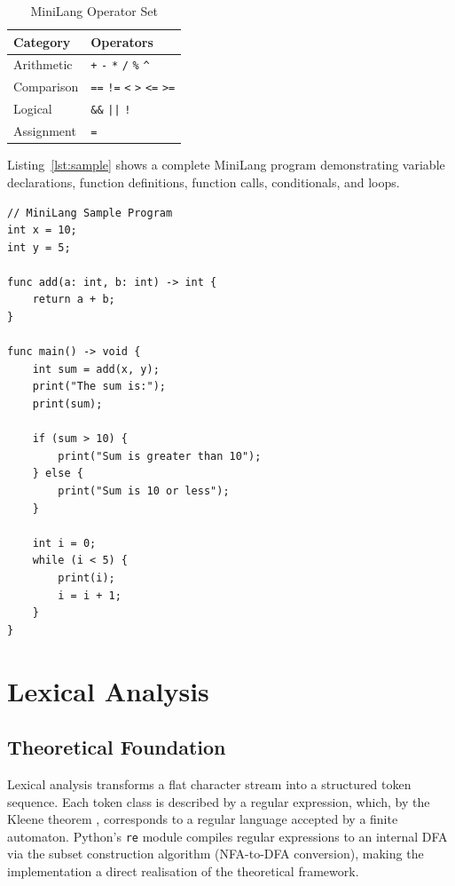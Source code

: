 \documentclass[conference]{IEEEtran}
\begin{document}
\begin{table}[htbp]
\caption{MiniLang Operator Set}
\label{tab:operators}
\centering
\renewcommand{\arraystretch}{1.2}
\begin{tabular}{@{}ll@{}}
\toprule
\textbf{Category} & \textbf{Operators} \\
\midrule
Arithmetic     & \texttt{+} \texttt{-} \texttt{*} \texttt{/} \texttt{\%} \texttt{\^{}} \\
Comparison     & \texttt{==} \texttt{!=} \texttt{<} \texttt{>} \texttt{<=} \texttt{>=} \\
Logical        & \texttt{\&\&} \texttt{||} \texttt{!} \\
Assignment     & \texttt{=} \\
\bottomrule
\end{tabular}
\end{table}

Listing~\ref{lst:sample} shows a complete MiniLang program
demonstrating variable declarations, function definitions, function
calls, conditionals, and loops.

\begin{lstlisting}[language=MiniLang, caption={Sample MiniLang program (example.ml)}, label={lst:sample}]
// MiniLang Sample Program
int x = 10;
int y = 5;

func add(a: int, b: int) -> int {
    return a + b;
}

func main() -> void {
    int sum = add(x, y);
    print("The sum is:");
    print(sum);

    if (sum > 10) {
        print("Sum is greater than 10");
    } else {
        print("Sum is 10 or less");
    }

    int i = 0;
    while (i < 5) {
        print(i);
        i = i + 1;
    }
}
\end{lstlisting}

\section{Lexical Analysis}
\label{sec:lexer}

\subsection{Theoretical Foundation}

Lexical analysis transforms a flat character stream into a structured
token sequence. Each token class is described by a regular expression,
which, by the Kleene theorem \cite{kleene, hopcroft2001}, corresponds to a regular
language accepted by a finite automaton. Python's \texttt{re} module
compiles regular expressions to an internal DFA via the subset
construction algorithm (NFA-to-DFA conversion), making the
implementation a direct realisation of the theoretical framework.
\end{document}
